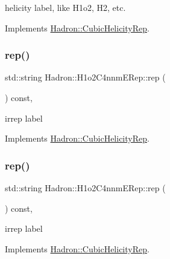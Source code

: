 helicity label, like H1o2, H2, etc. 

Implements \mbox{\hyperlink{structHadron_1_1CubicHelicityRep_af1096946b7470edf0a55451cc662f231}{Hadron\+::\+Cubic\+Helicity\+Rep}}.

\mbox{\label{structHadron_1_1H1o2C4nnmERep_aa142fe62212d47d4993ca54c3f3ab655}} 
\subsubsection{\texorpdfstring{rep()}{rep()}\hspace{0.1cm}{\footnotesize\ttfamily [1/2]}}
{\footnotesize\ttfamily std\+::string Hadron\+::\+H1o2\+C4nnm\+E\+Rep\+::rep (\begin{DoxyParamCaption}{ }\end{DoxyParamCaption}) const\hspace{0.3cm}{\ttfamily [inline]}, {\ttfamily [virtual]}}

irrep label 

Implements \mbox{\hyperlink{structHadron_1_1CubicHelicityRep_a8cdd86f068a167dc96faef02bfb8a33d}{Hadron\+::\+Cubic\+Helicity\+Rep}}.

\mbox{\label{structHadron_1_1H1o2C4nnmERep_aa142fe62212d47d4993ca54c3f3ab655}} 
\subsubsection{\texorpdfstring{rep()}{rep()}\hspace{0.1cm}{\footnotesize\ttfamily [2/2]}}
{\footnotesize\ttfamily std\+::string Hadron\+::\+H1o2\+C4nnm\+E\+Rep\+::rep (\begin{DoxyParamCaption}{ }\end{DoxyParamCaption}) const\hspace{0.3cm}{\ttfamily [inline]}, {\ttfamily [virtual]}}

irrep label 

Implements \mbox{\hyperlink{structHadron_1_1CubicHelicityRep_a8cdd86f068a167dc96faef02bfb8a33d}{Hadron\+::\+Cubic\+Helicity\+Rep}}.

\mbox{\label{structHadron_1_1H1o2C4nnmERep_ac93d65bb6c3d39b21cc3954eb7b92331}} 
